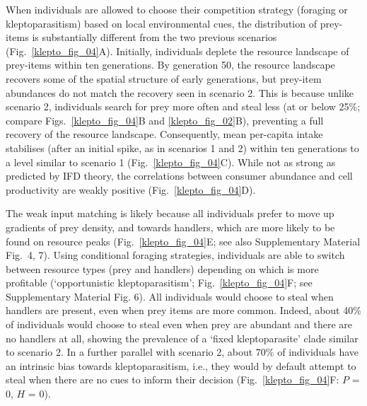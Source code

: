 When individuals are allowed to choose their competition strategy (foraging or kleptoparasitism) based on local environmental cues, the distribution of prey-items is substantially different from the two previous scenarios (Fig.~\ref{klepto_fig_04}A).
Initially, individuals deplete the resource landscape of prey-items within ten generations.
By generation 50, the resource landscape recovers some of the spatial structure of early generations, but prey-item abundances do not match the recovery seen in scenario 2.
This is because unlike scenario 2, individuals search for prey more often and steal less (at or below 25\%; compare Figs.~\ref{klepto_fig_04}B and \ref{klepto_fig_02}B), preventing a full recovery of the resource landscape.
Consequently, mean per-capita intake stabilises (after an initial spike, as in scenarios 1 and 2) within ten generations to a level similar to scenario 1 (Fig.~\ref{klepto_fig_04}C).
While not as strong as predicted by IFD theory, the correlations between consumer abundance and cell productivity are weakly positive (Fig.~\ref{klepto_fig_04}D).

The weak input matching is likely because all individuals prefer to move up gradients of prey density, and towards handlers, which are more likely to be found on resource peaks (Fig.~\ref{klepto_fig_04}E; see also Supplementary Material Fig.~4, 7).
Using conditional foraging strategies, individuals are able to switch between resource types (prey and handlers) depending on which is more profitable \parencite{emlen1966} (`opportunistic kleptoparasitism'; Fig.~\ref{klepto_fig_04}F; see Supplementary Material Fig. 6).
All individuals would choose to steal when handlers are present, even when prey items are more common.
Indeed, about 40\% of individuals would choose to steal even when prey are abundant and there are no handlers at all, showing the prevalence of a `fixed kleptoparasite' clade similar to scenario 2.
In a further parallel with scenario 2, about 70\% of individuals have an intrinsic bias towards kleptoparasitism, i.e., they would by default attempt to steal when there are no cues to inform their decision (Fig.~\ref{klepto_fig_04}F: $P$ = 0, $H$ = 0).

